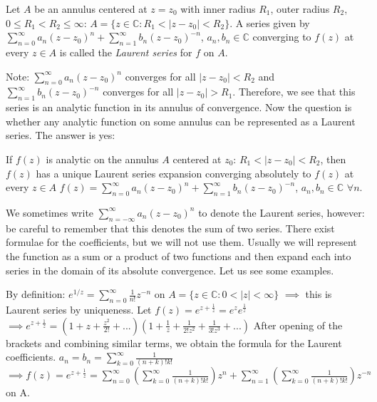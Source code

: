 \documentclass[12pt]{article}
\begin{document}
\begin{definition}
Let $A$ be an annulus centered at $z = z_0$ with inner radius $R_1$, outer radius $R_2$, $0 \leq R_1 < R_2 \leq \infty$: $A = \{z \in \mathbb{C}: R_1 < |z-z_0| < R_2\}$.
A series given by $\sum_{n=0}^\infty a_n(z-z_0)^n + \sum_{n=1}^\infty b_n(z-z_0)^{-n}$, $a_n, b_n \in \mathbb{C}$ converging to $f(z)$ at every $z \in A$ is called the \emph{Laurent series} for $f$ on $A$.
\end{definition}

\begin{remark}
Note: $\sum_{n=0}^\infty a_n(z-z_0)^n$ converges for all $|z-z_0| < R_2$ and $\sum_{n=1}^\infty b_n(z-z_0)^{-n}$ converges for all $|z-z_0| > R_1$. Therefore, we see that this series is an analytic function in its annulus of convergence. Now the question is whether any analytic function on some annulus can be represented as a Laurent series. The answer is yes:
\end{remark}

\begin{theorem}
If $f(z)$ is analytic on the annulus $A$ centered at $z_0$: $R_1 < |z-z_0| < R_2$, then $f(z)$ has a unique Laurent series expansion converging absolutely to $f(z)$ at every $z \in A$
$f(z) = \sum_{n=0}^\infty a_n(z-z_0)^n + \sum_{n=1}^\infty b_n(z-z_0)^{-n}$, $a_n, b_n \in \mathbb{C}$ $\forall n$.
\end{theorem}

\begin{remark}
We sometimes write $\sum_{n=-\infty}^\infty a_n(z-z_0)^n$ to denote the Laurent series, however: be careful to remember that this denotes the sum of two series.
There exist formulae for the coefficients, but we will not use them. Usually we will represent the function as a sum or a product of two functions and then expand each into series in the domain of its absolute convergence. Let us see some examples.
\end{remark}

\begin{example}
By definition: $e^{1/z} = \sum_{n=0}^\infty \frac{1}{n!}z^{-n}$ on $A = \{z \in \mathbb{C}: 0 < |z| < \infty\}$
$\implies$ this is Laurent series by uniqueness. Let $f(z) = e^{z + \frac{1}{z}} = e^z e^{\frac{1}{z}}$
$\implies e^{z + \frac{1}{z}} = (1 + z + \frac{z^2}{2!} + ...) (1 + \frac{1}{z} + \frac{1}{2!z^2} + \frac{1}{3!z^3} + ...)$
After opening of the brackets and combining similar terms, we obtain the formula for the Laurent coefficients.
$a_n = b_n = \sum_{k=0}^\infty \frac{1}{(n+k)!k!}$
$\implies f(z) = e^{z + \frac{1}{z}} = \sum_{n=0}^\infty (\sum_{k=0}^\infty \frac{1}{(n+k)!k!})z^n + \sum_{n=1}^\infty (\sum_{k=0}^\infty \frac{1}{(n+k)!k!})z^{-n}$ on A.
\end{example}
\end{document}
